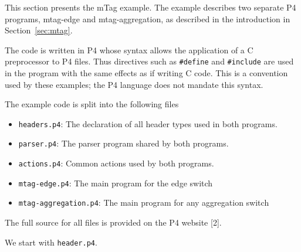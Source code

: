 \documentclass[12pt]{article}
\begin{document}


This section presents the mTag example. The example describes two separate 
P4 programs, mtag-edge and mtag-aggregation, as described in the introduction 
in Section~\ref{sec:mtag}.

The code is written in P4 whose syntax allows the application of a C preprocessor 
to P4 files. Thus directives such as \texttt{\#define} and \texttt{\#include} are used in 
the program with the same effects as if writing C code. This is a convention 
used by these examples; the P4 language does not mandate this syntax.

The example code is split into the following files

\begin{itemize}
\item
\texttt{headers.p4}: The declaration of all header types used in both programs.
\item
\texttt{parser.p4}: The parser program shared by both programs.
\item
\texttt{actions.p4}: Common actions used by both programs.
\item
\texttt{mtag-edge.p4}: The main program for the edge switch
\item
\texttt{mtag-aggregation.p4}: The main program for any aggregation switch
\end{itemize}

The full source for all files is provided on the P4 website [2].

We start with \texttt{header.p4}. 

\end{document}
